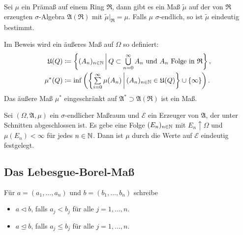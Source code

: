 \documentclass{cheat-sheet}
\newcommand{\Alg}{\mathfrak{A}} %
\newcommand{\Ring}{\mathfrak{R}} %
\begin{document}
\begin{satz}
  Sei $\mu$ ein Prämaß auf einem Ring $\Ring$, dann gibt es ein Maß $\tilde{\mu}$ auf der von $\Ring$ erzeugten $\sigma$-Algebra $\Alg(\Ring)$ mit $\tilde{\mu}|_\Ring = \mu$. Falls $\mu$ $\sigma$-endlich, so ist $\tilde{\mu}$ eindeutig bestimmt.
\end{satz}

\begin{bem}
  Im Beweis wird ein äußeres Maß auf $\Omega$ so definiert:
  \begin{align*}
    \mathfrak{U}(Q) &\coloneqq \left\{ (A_n)_{n \in \N} \,\middle|\, Q \subset \bigcup_{n = 0}^\infty A_n \text{ und } A_n \text{ Folge in } \Ring \right\}, \\
    \mu^*(Q) &\coloneqq \inf \left( \left\{ \sum_{i = 0}^\infty \mu(A_n) \,\middle|\, (A_n)_{n \in \N} \in \mathfrak{U}(Q) \right\} \cup \{ \infty \} \right).
  \end{align*}
  Das äußere Maß $\mu^*$ eingeschränkt auf $\Alg^* \supset \Alg(\Ring)$ ist ein Maß.
\end{bem}

\begin{satz}
  Sei $(\Omega, \Alg, \mu)$ ein $\sigma$-endlicher Maßraum und $\mathcal{E}$ ein Erzeuger von $\Alg$, der unter Schnitten abgeschlossen ist. Es gebe eine Folge $(E_n)_{n \in \mathbb{N}}$ mit $E_n \uparrow \Omega$ und $\mu(E_n) < \infty$ für jedes $n \in \mathbb{N}$. Dann ist $\mu$ durch die Werte auf $\mathcal{E}$ eindeutig festgelegt.
\end{satz}

\begin{samepage}

\subsection{Das Lebesgue-Borel-Maß}

\begin{nota}
  Für $a = (a_1, ..., a_n)$ und $b = (b_1, ..., b_n)$ schreibe
  \begin{itemize}
    \item $a \lhd b$, falls $a_j < b_j$ für alle $j = 1, ..., n$.
    \item $a \unlhd b$, falls $a_j \leq b_j$ für alle $j = 1, ..., n$.
  \end{itemize}
\end{nota}

\end{samepage}
\end{document}
